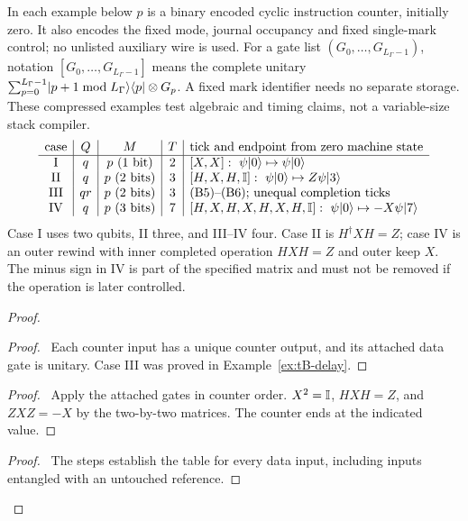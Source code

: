 \begin{example}\label{ex:tB-table}
In each example below $p$ is a binary encoded cyclic instruction
counter, initially zero. It also encodes the fixed mode, journal
occupancy and fixed single-mark control; no unlisted auxiliary wire is
used. For a gate list $(G_0,\ldots,G_{L_{\Gamma}-1})$, notation
$[G_0,\ldots,G_{L_{\Gamma}-1}]$ means the complete unitary
$\sum_{p=0}^{L_{\Gamma}-1}\lvert p+1\bmod L_{\Gamma}\rangle\langle p\rvert\otimes G_p$.
A fixed mark identifier needs no separate storage. These compressed
examples test algebraic and timing claims, not a variable-size stack
compiler.
\[
\begin{array}{c|c|c|c|l}
\text{case}&Q&M&T&\text{tick and endpoint from zero machine state}\\\hline
\mathrm{I}&q&p\ (1\text{ bit})&2&[X,X]:\ \psi\ket0\mapsto\psi\ket0\\
\mathrm{II}&q&p\ (2\text{ bits})&3&[H,X,H,\id]:\ \psi\ket0\mapsto Z\psi\ket3\\
\mathrm{III}&qr&p\ (2\text{ bits})&3&\text{(B5)--(B6); unequal completion ticks}\\
\mathrm{IV}&q&p\ (3\text{ bits})&7&[H,X,H,X,H,X,H,\id]:\
 \psi\ket0\mapsto -X\psi\ket7
\end{array}
\]
Case I uses two qubits, II three, and III--IV four. Case II is
$H^\dagger XH=Z$; case IV is an outer rewind with inner completed
operation $HXH=Z$ and outer keep $X$.
The minus sign in IV is part of the specified matrix and must not be
removed if the operation is later controlled.
\end{example}
\begin{proof}
 \begin{proof}\pf\ Each counter input has a unique counter output,
 and its attached data gate is unitary. Case III was proved in
 Example~\ref{ex:tB-delay}.\end{proof}
 \begin{proof}\pf\ Apply the attached gates in counter order.
 $X^2=\mathbb{I}$, $HXH=Z$, and $ZXZ=-X$ by the two-by-two matrices.
 The counter ends at the indicated value.\end{proof}
 \qedstep
 \begin{proof}\pf\ The steps establish the table for every data
 input, including inputs entangled with an untouched reference.\end{proof}
\end{proof}

